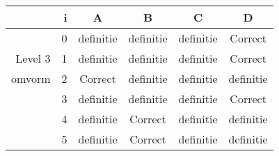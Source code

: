 \begin{tabular}{ rr| c|c|c|c}\hline\hline
     & i & \textbf{A} & \textbf{B} & \textbf{C} & \textbf{D}\\\hline

&0&definitie&definitie&definitie&Correct\cellcolor[gray]{0.6}\\
Level 3 & 1&definitie&definitie&definitie&Correct\cellcolor[gray]{0.6}\\
omvorm &2&Correct\cellcolor[gray]{0.6}&definitie&definitie&definitie\\
&3&definitie&definitie&definitie&Correct\cellcolor[gray]{0.6}\\
&4&definitie&Correct\cellcolor[gray]{0.6}&definitie&definitie\\
&5&definitie&Correct\cellcolor[gray]{0.6}&definitie&definitie\\
\hline\end{tabular}\par\ \newline

